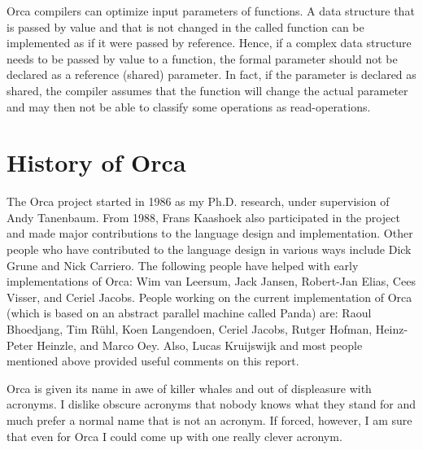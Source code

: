 \documentclass[10pt]{article}
\begin{document}
Orca compilers can optimize input parameters of functions.
A data structure that is passed by value and that is not changed in the
called function can be implemented as if it were passed by reference.
Hence, if a complex data structure needs to be passed by value to
a function, the formal parameter should not be declared as a reference
(shared) parameter.
In fact, if the parameter is declared as shared,
the compiler assumes that the function will
change the actual parameter and may then not be able to classify some operations
as read-operations.
\section{History of Orca}

The Orca project started in 1986 as my Ph.D. research, under
supervision of Andy Tanenbaum.
From 1988, Frans Kaashoek also participated in the project and
made major contributions to the language design and implementation.
Other people who have contributed to the language design in
various ways include Dick Grune and Nick Carriero.
The following people have helped with early implementations of Orca:
Wim van Leersum, Jack Jansen, Robert-Jan Elias, Cees Visser, and Ceriel Jacobs.
People working on the current implementation of Orca (which is based
on an abstract parallel machine called Panda) are:
Raoul Bhoedjang,
Tim R\"uhl,
Koen Langendoen,
Ceriel Jacobs,
Rutger Hofman,
Heinz-Peter Heinzle, and
Marco Oey.
Also, Lucas Kruijswijk and most people mentioned above provided
useful comments on this report.

Orca is given its name in awe of killer whales and out of displeasure with
acronyms. I dislike obscure acronyms that nobody knows what they stand for
and much prefer a normal name that is not an acronym.
If forced, however, I am sure that even for Orca I could come up with
one really clever acronym.

\nocite{*}


\end{document}
